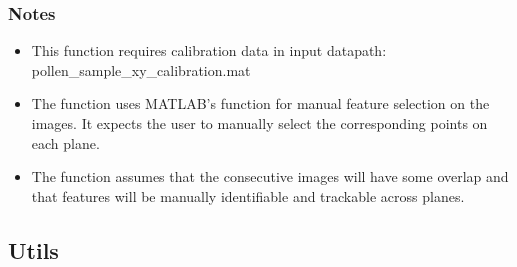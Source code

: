 \documentclass[letterpaper,10pt,english]{sphinxmanual}
\begin{document}
\begin{fulllineitems}
\begin{quote}
\begin{description}
\begin{description}
\end{description}

\end{description}\end{quote}
\subsubsection*{Notes}
\begin{itemize}
\item {} 
\sphinxAtStartPar
This function requires calibration data in input datapath:
\sphinxhyphen{} pollen\_sample\_xy\_calibration.mat

\item {} 
\sphinxAtStartPar
The function uses MATLAB’s  function for manual feature selection
on the images. It expects the user to manually select the corresponding
points on each plane.

\item {} 
\sphinxAtStartPar
The function assumes that the consecutive images will have some overlap
and that features will be manually identifiable and trackable across planes.

\end{itemize}

\end{fulllineitems}


\sphinxstepscope


\subsection{Utils}
\label{\detokenize{api/utils:utils}}\label{\detokenize{api/utils::doc}}
\end{document}
